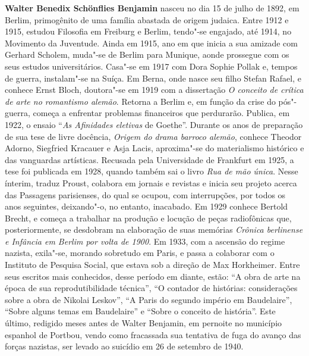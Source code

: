 
\textbf{Walter Benedix Schönflies Benjamin} nasceu no dia 15 de julho de 1892, em Berlim,
primogênito de uma família abastada de origem judaica. Entre 1912 e 1915, estudou Filosofia
em Freiburg e Berlim, tendo"-se engajado, até 1914, no Movimento da Juventude. Ainda em
1915, ano em que inicia a sua amizade com Gerhard Scholem, muda"-se de Berlim para
Munique, aonde prossegue com os seus estudos universitários. Casa"-se em 1917 com Dora
Sophie Pollak e, tempos de guerra, instalam"-se na Suíça. Em Berna, onde nasce seu filho Stefan
Rafael, e conhece Ernst Bloch, doutora"-se em 1919 com a dissertação \emph{O conceito de crítica de
arte no romantismo alemão}. Retorna a Berlim e, em função da crise do pós"-guerra, começa a
enfrentar problemas financeiros que perdurarão. Publica, em 1922, o ensaio ``\emph{As Afinidades
eletivas} de Goethe''. Durante os anos de preparação de sua tese de livre docência, \emph{Origem do
drama barroco alemão}, conhece Theodor Adorno, Siegfried Kracauer e Asja Lacis, aproxima"-se do materialismo histórico e das vanguardas artísticas. Recusada pela Universidade de
Frankfurt em 1925, a tese foi publicada em 1928, quando também sai o livro \emph{Rua de mão única}.
Nesse ínterim, traduz Proust, colabora em jornais e revistas e inicia seu projeto acerca das
Passagens parisienses, do qual se ocupou, com interrupções, por todos os anos seguintes,
deixando"-o, no entanto, inacabado. Em 1929 conhece Bertold Brecht, e começa a trabalhar na
produção e locução de peças radiofônicas que, posteriormente, se desdobram na elaboração de
suas memórias \emph{Crônica berlinense e Infância em Berlim por volta de 1900}. Em 1933, com a
ascensão do regime nazista, exila"-se, morando sobretudo em Paris, e passa a colaborar com o
Instituto de Pesquisa Social, que estava sob a direção de Max Horkheimer. Entre seus escritos
mais conhecidos, desse período em diante, estão: ``A obra de arte na época de sua
reprodutibilidade técnica'', ``O contador de histórias: considerações sobre a obra de Nikolai
Leskov'', ``A Paris do segundo império em Baudelaire'', ``Sobre alguns temas em Baudelaire'' e
``Sobre o conceito de história''. Este último, redigido meses antes de Walter Benjamin, em
pernoite no município espanhol de Portbou, vendo como fracassada sua tentativa de fuga do
avanço das forças nazistas, ser levado ao suicídio em 26 de setembro de 1940.



